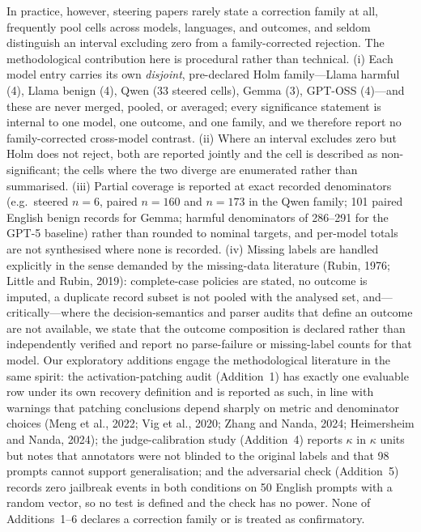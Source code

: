 In practice, however, steering papers rarely state a correction family at all,
frequently pool cells across models, languages, and outcomes, and seldom
distinguish an interval excluding zero from a family-corrected rejection. The
methodological contribution here is procedural rather than technical. (i) Each
model entry carries its own \emph{disjoint}, pre-declared Holm family---Llama
harmful (4), Llama benign (4), Qwen (33 steered cells), Gemma (3), GPT-OSS
(4)---and these are never merged, pooled, or averaged; every significance
statement is internal to one model, one outcome, and one family, and we
therefore report no family-corrected cross-model contrast. (ii) Where an
interval excludes zero but Holm does not reject, both are reported jointly and
the cell is described as non-significant; the cells where the two diverge are
enumerated rather than summarised. (iii) Partial coverage is reported at exact
recorded denominators (e.g.\ steered $n=6$, paired $n=160$ and $n=173$ in the
Qwen family; 101 paired English benign records for Gemma; harmful denominators
of 286--291 for the GPT-5 baseline) rather than rounded to nominal targets, and
per-model totals are not synthesised where none is recorded. (iv) Missing labels
are handled explicitly in the sense demanded by the missing-data literature
(Rubin, 1976; Little and Rubin, 2019): complete-case policies are stated, no
outcome is imputed, a duplicate record subset is not pooled with the analysed
set, and---critically---where the decision-semantics and parser audits that
define an outcome are not available, we state that the outcome composition is
declared rather than independently verified and report no parse-failure or
missing-label counts for that model. Our exploratory additions engage the
methodological literature in the same spirit: the activation-patching audit
(Addition~1) has exactly one evaluable row under its own recovery definition and
is reported as such, in line with warnings that patching conclusions depend
sharply on metric and denominator choices
(Meng et al., 2022; Vig et al., 2020; Zhang and Nanda, 2024;
Heimersheim and Nanda, 2024); the judge-calibration study (Addition~4) reports
$\kappa$ in $\kappa$ units but notes that annotators were not blinded to the
original labels and that 98 prompts cannot support generalisation; and the
adversarial check (Addition~5) records zero jailbreak events in both conditions
on 50 English prompts with a random vector, so no test is defined and the check
has no power. None of Additions~1--6 declares a correction family or is treated
as confirmatory.

